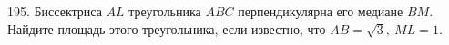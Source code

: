 195. Биссектриса $AL$ треугольника $ABC$ перпендикулярна его медиане $BM.$ Найдите площадь этого треугольника, если известно, что $AB=\sqrt{3},\ ML=1.$\\
